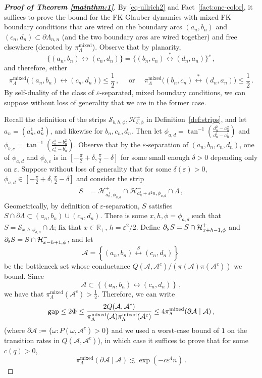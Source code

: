 \documentclass[reqno,11pt]{amsart}
\numberwithin{equation}{section}
\renewcommand{\epsilon}{\varepsilon}
\theoremstyle{definition}{
\newtheorem{example}[theorem]{Example}
\newtheorem{definition}[theorem]{Definition}
\newtheorem*{definition*}{Definition}
\newtheorem{problem}[theorem]{Problem}
\newtheorem{question}[theorem]{Question}
\newtheorem{remark}[theorem]{Remark}
}
\newcommand{\cH}{\ensuremath{\mathcal H}}
\newcommand{\cS}{\ensuremath{\mathcal S}}
\renewcommand{\epsilon}{\varepsilon}
\newcommand{\gap}{\text{\tt{gap}}}
\newcommand{\north}{{\textsc{n}}}
\newcommand{\south}{{\textsc{s}}}
\newcommand{\alt}{{\mathrm{mixed}}}
\begin{document}
\begin{proof}[\emph{\textbf{Proof of Theorem \ref{mainthm:1}}}]
By \eqref{eq-ullrich2} and Fact~\ref{fact:one-color}, it suffices to prove the bound for the FK Glauber dynamics with mixed FK boundary conditions that are wired on the boundary arcs $(a_n,b_n)$ and $(c_n,d_n)\subset \partial\Lambda_{n,n}$ (and the two boundary arcs are wired together) and free elsewhere (denoted by $\pi_\Lambda^{\mathrm{mixed}}$). Observe that by planarity,
\[\big\{(a_n,b_n)\longleftrightarrow (c_n,d_n)\big\} =\big\{(b_n,c_n)\stackrel{\ast}\longleftrightarrow (d_n,a_n)\big\}^c\,,
\]
and therefore, either
\[\pi^{\alt}_{\Lambda}\big((a_n,b_n)\longleftrightarrow (c_n,d_n)\big)\leq  \frac 12\,, \quad \mbox{ or }\quad
\pi^{\alt}_{\Lambda}\big((b_n,c_n)\stackrel{\ast}\longleftrightarrow (d_n,a_n)\big)\leq\frac 12\,.
\]
By self-duality of the class of $\epsilon$-separated, mixed boundary conditions, we can suppose without loss of generality that we are in the former case.

Recall the definition of the strips $\mathcal S_{b,h,\phi}, \mathcal H^{\pm}_{b,\phi}$ in Definition~\ref{def:strips}, and let $a_n=(a_n^1,a_n^2)$, and likewise for $b_n,c_n,d_n$.
Then let $\phi_{a,d}= \tan^{-1} (\frac {d^2_n-a^2_n}{d^1_n-a^1_n})$ and $\phi_{b,c}= \tan^{-1}(\frac {c_n^2 - b_n^2}{c_n^1 - b_n^1})$. Observe that by the $\epsilon$-separation of $(a_n,b_n,c_n,d_n)$, one of $\phi_{a,d}$ and $\phi_{b,c}$ is in $[-\frac \pi 2+\delta,\frac \pi 2 - \delta]$ for some small enough $\delta>0$ depending only on $\epsilon$. Suppose without loss of generality that for some $\delta(\epsilon)>0$, $\phi_{a,d}\in [-\frac \pi 2 +\delta, \frac \pi 2-\delta]$ and consider the strip
\begin{align*}
S & = \cH^+_{a^1_n, \phi_{a,d}}\cap \cH^-_{a^1_n+\epsilon^2 n, \phi_{a,d}}\cap \Lambda\,,
\end{align*}
Geometrically, by definition of $\epsilon$-separation, $S$ satisfies $S \cap \partial \Lambda \subset (a_n,b_n)\cup (c_n,d_n)$. There is some $x,h,\phi=\phi_{a,d}$ such that $S=\cS_{x,h,\phi_{a,d}}\cap \Lambda$; fix that $x\in \mathbb R_+$, $h= \epsilon^2/2$. Define $\partial_{\north} S=S \cap  \mathcal H^+_{x+h-1,\phi}$ and $\partial_\south S= S \cap \mathcal H^-_{x-h+1,\phi}$, and let
\[\mathcal A=\left\{(a_n,b_n)\stackrel{ S}\longleftrightarrow (c_n,d_n)\right\}\,
\]
be the bottleneck set whose conductance $Q(\mathcal A,\mathcal A^c)/(\pi(\mathcal A)\pi (\mathcal A^c))$ we bound. Since
\[\mathcal A \subset \left\{(a_n,b_n)\longleftrightarrow (c_n,d_n)\right\}\,,
\]
we have that $\pi_{\Lambda}^{\alt}(\mathcal A^c)>\frac 12$. Therefore, we can write 
\[\gap\leq 2\Phi \leq \frac {2Q(\mathcal A,\mathcal A^c)}{\pi_\Lambda^{\alt}(\mathcal A)\pi_{\Lambda}^{\alt}(\mathcal A^c)}\leq  4\pi_\Lambda^{\alt}(\partial \mathcal A\mid \mathcal A)\,,
\]
(where $\partial \mathcal A:=\{\omega:P(\omega,\mathcal A^c)>0\}$ and we used a worst-case bound of $1$ on the transition rates in $Q(\mathcal A, \mathcal A^c)$), in which case it suffices to prove that for some $c(q)>0$,
\[\pi_{\Lambda}^{\alt}(\partial \mathcal A\mid \mathcal A)\lesssim \exp(-c\epsilon^4 n)\,.
\]


\end{proof}
\end{document}
